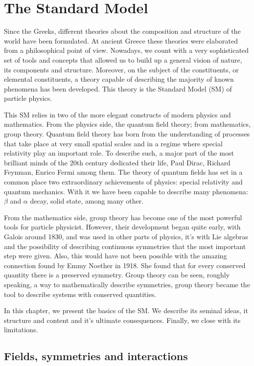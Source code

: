 \chapter[The Standard Model]{The Standard Model}
\label{chap:SM}
Since the Greeks, different theories about the composition and structure of the world have been formulated. At ancient Greece these theories were elaborated from a philosophical point of view. Nowadays, we count with a very sophisticated  set of tools and concepts that allowed us to build up a general vision of nature, its components and structure. Moreover, on the subject of the constituents, or elemental constituents, a theory capable of describing the majority of known phenomena has been developed. This theory is the Standard Model (SM) of particle physics. 

This SM relies in two of the more elegant constructs of modern physics and mathematics. From the physics side, the quantum field theory; from mathematics, group theory. Quantum field theory has born from the understanding of processes that take place at very small spatial scales and in a regime where special relativity play an important role. To describe such, a major part of the most brilliant minds of the 20th century dedicated their life, Paul Dirac, Richard Feynman, Enrico Fermi among them. The theory of quantum fields has set in a common place two extraordinary achievements of physics: special relativity and quantum mechanics. With it we have been capable to describe many phenomena: $\beta$ and $\alpha$ decay, solid state, among many other.

From the mathematics side, group theory has become one of the most powerful tools for particle physicist. However, their development began quite early, with Galois around 1830, and was used in other parts of physics, it's with Lie algebras and the possibility of describing continuous symmetries that the most important step were given. Also, this would have not been possible with the amazing connection found by Emmy Noether in 1918. She found that for every conserved quantity there is a preserved symmetry. Group theory can be seen, roughly speaking, a way to mathematically describe symmetries, group theory became the tool to describe systems with conserved quantities. 

In this chapter, we present the basics of the SM. We describe its seminal ideas, it structure and content and it's ultimate consequences. Finally, we close with its limitations.

\section{Fields, symmetries and interactions}
\label{sec:symm}

